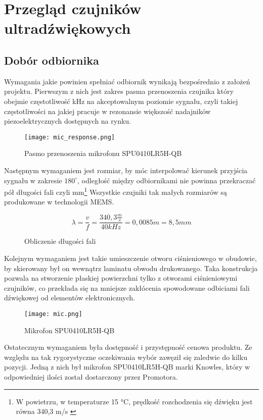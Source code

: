 \chapter[Przegląd czujników ultradźwiękowych]{Przegląd czujników ultradźwiękowych}

\label{chapter:przeglad_czujnikow}




\section{Dobór odbiornika}
Wymagania jakie powinien spełniać odbiornik wynikają bezpośrednio z założeń projektu. 
Pierwszym z nich jest zakres pasma przenoszenia czujnika który obejmie częstotliwość \unit[40]{kHz} na akceptowalnym poziomie sygnału, 
czyli takiej częstotliwości na jakiej pracuje w rezonansie większość nadajników piezoelektrycznych dostępnych na rynku. 

\begin{figure}[ht!]
    \centering
    \texttt{[image: mic\_response.png]}
    \caption{Pasmo przenoszenia mikrofonu SPU0410LR5H-QB}
    \label{fig:}
\end{figure}
\noindent
Następnym wymaganiem jest rozmiar, by móc interpolować kierunek przyjścia sygnału w zakresie $180^\circ$, 
odległość między odbiornikami nie powinna przekraczać pół długości fali czyli \unit[4,25]{mm}\footnote[1]{W powietrzu, w temperaturze 15 °C, prędkość rozchodzenia się dźwięku jest równa 340,3 m/s \cite{sound_speed}}
Wszystkie czujniki tak małych rozmiarów są produkowane w technologii MEMS. 
\begin{figure}[ht!]
    $$\lambda = \frac{v}{f} = \frac{340,3\frac{m}{s}}{40kHz}=0,0085m = 8,5mm$$
\caption{Obliczenie długości fali}    
\end{figure}
\noindent
Kolejnym wymaganiem jest takie umieszczenie otworu ciśnieniowego w obudowie, by skierowany był on wewnątrz laminatu obwodu drukowanego. 
Taka konstrukcja pozwala na stworzenie płaskiej powierzchni tylko z otworami ciśnieniowymi czujników, 
co przekłada się na mniejsze zakłócenia spowodowane odbiciami fali dźwiękowej od elementów elektronicznych.

\begin{figure}[ht!]
    \centering
    \texttt{[image: mic.png]}
    \caption{Mikrofon SPU0410LR5H-QB}
    \label{fig:mic}
\end{figure}
\noindent
Ostatecznym wymaganiem była dostępność i przystępność cenowa produktu. Ze względu na tak rygorystyczne oczekiwania wybór zawęził się zaledwie do kilku pozycji.
Jedną z nich był mikrofon SPU0410LR5H-QB marki Knowles\cite{knowles}, który w odpowiedniej ilości został dostarczony przez Promotora.



